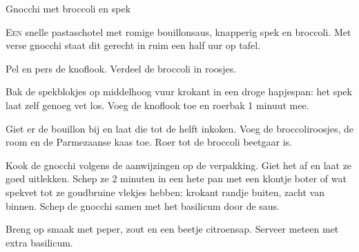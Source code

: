 \begin{recipe}{Gnocchi met broccoli en spek}


\lettrine{E}{en} snelle pastaschotel met romige bouillonsaus,
knapperig spek en broccoli. Met verse gnocchi staat dit gerecht in ruim een half uur op tafel.

\begin{ingredients}
\end{ingredients}

\begin{steps}
  \item Pel en pers de knoflook. Verdeel de broccoli in roosjes.
  \item Bak de spekblokjes op middelhoog vuur krokant in een droge hapjespan: het spek laat
        zelf genoeg vet los. Voeg de knoflook toe en roerbak 1 minuut mee.
  \item Giet er de bouillon bij en laat die tot de helft
        inkoken. Voeg de broccoliroosjes, de room en de Parmezaanse kaas toe.
        Roer tot de broccoli beetgaar is.
  \item Kook de gnocchi volgens de aanwijzingen op de verpakking. Giet het af
        en laat ze goed uitlekken. Schep ze 2 minuten in een hete pan met een
        klontje boter of wat spekvet tot ze goudbruine vlekjes hebben: krokant
        randje buiten, zacht van binnen. Schep de gnocchi samen met het
        basilicum door de saus.
  \item Breng op smaak met peper, zout en een beetje citroensap. Serveer
        meteen met extra basilicum.
\end{steps}
\end{recipe}
